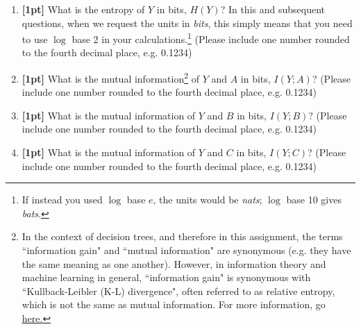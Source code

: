 \documentclass[11pt]{article}
\numberwithin{equation}{section} %
\numberwithin{figure}{section} %
\numberwithin{table}{section} %
\begin{document}
\begin{enumerate}
    \item \textbf{[1pt]} What is the entropy of $Y$ in bits, $H(Y)$? In this and subsequent questions, when we request the units in \emph{bits}, this simply means that you need to use $\log$ base 2 in your calculations.\footnote{If instead you used $\log$ base $e$, the units would be \emph{nats}; $\log$ base 10 gives \emph{bats}.}
    (Please include one number rounded to the fourth decimal place, e.g. 0.1234)
    
    \begin{tcolorbox}[fit,height=1cm, width=2cm, blank, borderline={1pt}{-2pt},nobeforeafter]
    \end{tcolorbox}
    
    
    \item \textbf{[1pt]} What is the mutual information\footnote{In the context of decision trees, and therefore in this assignment, the terms ``information gain" and ``mutual information" are synonymous (e.g. they have the same meaning as one another). However, in information theory and machine learning in general, ``information gain" is synonymous with ``Kullback-Leibler (K-L) divergence", often referred to as relative entropy, which is not the same as mutual information. For more information, go \href{https://en.wikipedia.org/wiki/Information_gain_in_decision_trees}{here.} } 
    of $Y$ and $A$ in bits, $I(Y; A)$?
    (Please include one number rounded to the fourth decimal place, e.g. 0.1234)
    
    \begin{tcolorbox}[fit,height=1cm, width=2cm, blank, borderline={1pt}{-2pt},nobeforeafter]
    \end{tcolorbox}
    

\clearpage
    \item \textbf{[1pt]} What is the mutual information of $Y$ and $B$ in bits, $I(Y; B)$?
    (Please include one number rounded to the fourth decimal place, e.g. 0.1234)
    
    \begin{tcolorbox}[fit,height=1cm, width=2cm, blank, borderline={1pt}{-2pt},nobeforeafter]
    \end{tcolorbox}
    
    
    \item \textbf{[1pt]} What is the mutual information of $Y$ and $C$ in bits, $I(Y; C)$?
    (Please include one number rounded to the fourth decimal place, e.g. 0.1234)
    

\end{enumerate}
\end{document}
